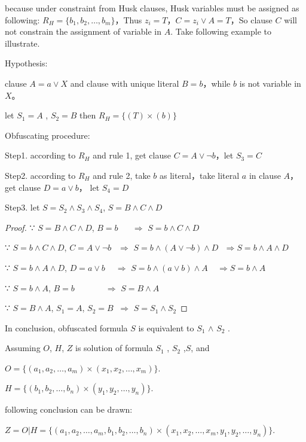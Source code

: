 \documentclass[runningheads,a4paper]{llncs}
\begin{document}
because under constraint from Husk clauses, Husk variables  must be assigned as following: 
$R_H=\{b_1,b_2,\dots,b_m\}$，Thus $z_i=T$，$C=z_i\vee A=T$，So clause $C$ will not constrain the assignment of variable in $A$.
Take following example to illustrate.

\noindent Hypothesis: 

clause $A=a\vee X$ and clause with unique literal $B=b$，while $b$ is not variable in $X$。

let $S_1=A$ , $S_2=B$  then $R_H=\{(T)\times(b)\}$ 

\noindent Obfuscating procedure:

Step1. according to $R_H$ and rule 1, get clause $C=A\vee \neg b$，let $S_3=C$

Step2. according to $R_H$ and rule 2, take $b$ as literal，take literal $a$ in clause $A$，get clause $D=a\vee b$， let $S_4=D$

Step3. let $S=S_2 \wedge S_3\wedge S_4$, $S=B\wedge C\wedge D$


\begin{proof}

∵ $S=B\wedge C\wedge D$, $B=b$ $~~~~~~\Longrightarrow$ $S=b\wedge C\wedge D$

∵ $S=b\wedge C\wedge D$, $C=A\vee \neg b$ $~~\Longrightarrow$ $S=b\wedge (A\vee \neg b)\wedge D ~~~\Longrightarrow S=b\wedge A\wedge D$

∵ $S=b\wedge A\wedge D$,  $D=a\vee b$  $~~~~\Longrightarrow$ $S=b\wedge (a\vee b)\wedge A ~~~~~\Longrightarrow S=b\wedge A$

∵ $S=b\wedge A$, $B=b$  $~~~~~~~~~~~~~~~\Longrightarrow$ $S= B\wedge A$ 

∵ $S=B\wedge A$,    $S_1=A$,  $S_2=B$   $~\Longrightarrow$ $S= S_1\wedge S_2$ 
\end{proof}

In conclusion, obfuscated formula $S$ is equivalent to $S_1$ $\wedge$  $S_2$ .

Assuming $O$, $H$, $Z$ is solution of formula $S_1$ , $S_2$ ,$S$, and

$O=\{(a_1,a_2,\dots,a_m)\times(x_1,x_2,\dots,x_m)\}$. 

$H=\{(b_1,b_2,\dots,b_n)\times(y_1,y_2,\dots,y_n)\}$. 


following conclusion can be drawn:

$Z=O|H=\{(a_1,a_2,\dots,a_m,b_1,b_2,\dots,b_n)\times(x_1,x_2,\dots,x_m,y_1,y_2,\dots,y_n)\}$.
\end{document}

